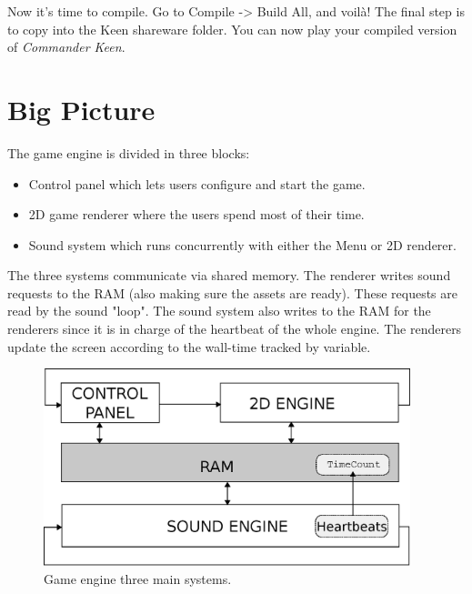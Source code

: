 \documentclass[book.tex]{subfiles}
\begin{document}
\par
Now it's time to compile. Go to Compile -> Build All, and voil\`a! The final step is to copy  into the Keen shareware folder. You can now play your compiled version of \textit{Commander Keen}. \\

\begin{figure}[H]
\centering
\end{figure}

 \begin{figure}[H]
\centering
\end{figure}


\section{Big Picture}
The game engine is divided in three blocks:
\begin{itemize}
\item Control panel which lets users configure and start the game.
\item 2D game renderer where the users spend most of their time.
\item Sound system which runs concurrently with either the Menu or 2D renderer. 
\end{itemize}
The three systems communicate via shared memory. The renderer writes sound requests to the RAM (also making sure the assets are ready). These requests are read by the sound "loop". The sound system also writes to the RAM for the renderers since it is in charge of the heartbeat of the whole engine. The renderers update the screen according to the wall-time tracked by  variable.
\par
\begin{figure}[H]
\centering
 \includegraphics[width=0.95\textwidth]{imgs/drawings/three_systems.eps}
 \caption{Game engine three main systems.}
 \end{figure}
 \par
 
\end{document}
